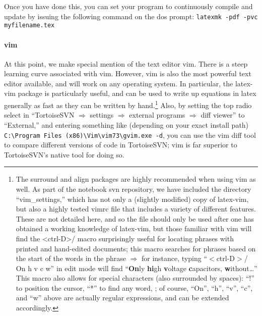 Once you have done this, you can set
    your program to continuously compile and update
    by issuing the following command on the dos prompt:
    \verb|latexmk -pdf -pvc myfilename.tex|
\paragraph{vim}
At this point, we make special mention of
    the text editor vim.
There is a steep learning curve associated with vim.
However, vim is also the most powerful text editor available,
    and will work on any operating system.
In particular, the latex-vim package is particularly useful,
    and can be used to write up equations in latex generally
    as fast as they can be written by hand.\footnote{The surround and align packages  are highly recommended when using vim as well.
    As part of the notebook svn repository, we have included
        the directory ``vim\_settings,'' which has not only
        a (slightly modified) copy of latex-vim, but also a highly
        tested vimrc file that includes a variety of different features.
    These are not detailed here, and so the file should only be used
        after one has obtained a working knowledge of latex-vim,
        but those familiar with vim will find the <ctrl-D>/ macro
        surprisingly useful for locating phrases with
        printed and hand-edited documents;
        this macro searches for phrases
        based on the start of the words in the phrase $\Rightarrow$
        for instance, typing ``$<$ctrl-D$>$/ On h v c w''
        in edit mode will find ``{\bf On}ly {\bf hi}gh {\bf v}oltage {\bf c}apacitors, {\bf w}ithout\ldots''
    This macro also allows for special characters (also surrounded by spaces):
    ``!'' to position the cursor, ``*'' to find any word, ;
        of course,
        ``On'', ``h'', ``v'', ``c'', and ``w'' above are actually
        regular expressions, and can be extended accordingly.}
Also, by setting the top radio select in
    ``TortoiseSVN $\Rightarrow$ settings $\Rightarrow$ external programs $\Rightarrow$ diff viewer''
    to ``External,'' and entering something like (depending on your exact install path)
    \verb|C:\Program Files (x86)\Vim\vim73\gvim.exe -d|,
    you can use the vim diff tool to compare different versions of code
    in TortoiseSVN;
    vim is far superior to TortoiseSVN's native tool for doing so.
